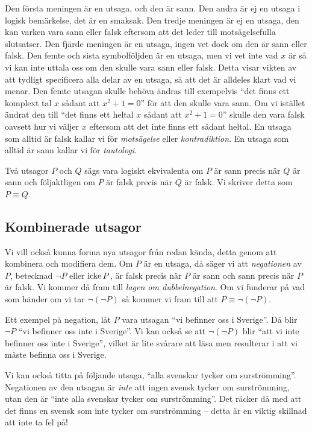 Den första meningen är en utsaga, och den är sann.
Den andra är ej en utsaga i logisk bemärkelse, det är en smaksak.
Den tredje meningen är ej en utsaga, den kan varken vara sann eller falsk
eftersom att det leder till motsägelsefulla slutsatser.
Den fjärde meningen är en utsaga, ingen vet dock om den är sann eller falsk.
Den femte och sista symbolföljden är en utsaga, men vi vet inte vad \(x\) är så
vi kan inte uttala oss om den skulle vara sann eller falsk.
Detta visar vikten av att tydligt specificera alla delar av en utsaga, så att
det är alldeles klart vad vi menar.
Den femte utsagan skulle behöva ändras till exempelvis \enquote{det finns ett
komplext tal \(x\) sådant att \(x^2+1=0\)} för att den skulle vara sann.
Om vi istället ändrat den till \enquote{det finns ett heltal \(x\) sådant att
\(x^2+1=0\)} skulle den vara falsk oavsett hur vi väljer \(x\) eftersom att
det inte finns ett sådant heltal.  En utsaga som alltid är falsk kallar vi för 
\emph{motsägelse} eller
\emph{kontradiktion}.
En utsaga som alltid är sann kallar vi för \emph{tautologi}.

Två utsagor \(P\) och \(Q\) sägs vara logiskt 
ekvivalenta om \(P\) är sann
precis när \(Q\) är sann och följaktligen om \(P\) är falsk precis när \(Q\)
är falsk.
Vi skriver detta som \(P\equiv Q\).

\subsection{Kombinerade utsagor}

Vi vill också kunna forma nya utsagor från redan kända, detta genom att
kombinera och modifiera dem.
Om \(P\) är en utsaga, då säger vi att \emph{negationen} 
av \(P\), betecknad \(\lnot P\) eller \(\operatorname{icke} P\), är falsk precis när \(P\) är 
sann och sann precis när \(P\) är falsk.
Vi kommer då fram till \emph{lagen om dubbelnegation}.
Om vi funderar på vad som händer om vi tar \(\lnot(\lnot P)\) så kommer vi
fram till att \(P\equiv \lnot(\lnot P)\).
\begin{example}
  Ett exempel på negation, låt \(P\) vara utsagan \enquote{vi befinner oss i
  Sverige}.
  Då blir \(\lnot P\) \enquote{vi befinner oss inte i Sverige}.
  Vi kan också se att \(\lnot(\lnot P)\) blir \enquote{att vi inte befinner oss 
  inte i Sverige}, vilket är lite svårare att läsa men resulterar i att vi 
  måste befinna oss i Sverige.
\end{example}
\begin{example}
  Vi kan också titta på följande utsaga, \enquote{alla svenskar tycker om
  surströmming}.
  Negationen av den utsagan är \emph{inte} att ingen svensk tycker om
  surströmming, utan den är \enquote{inte alla svenskar tycker om 
  surströmming}.
  Det räcker då med att det finns en svensk som inte tycker om
  surströmming -- detta är en viktig skillnad att inte ta fel på!
\end{example}

